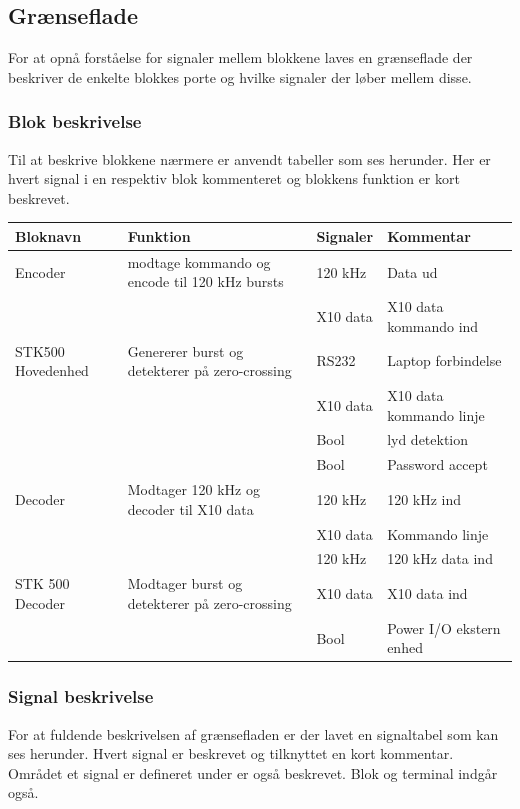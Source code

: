 \clearpage
\newpage

\begin{table}[htbp] %
\subsection{Grænseflade}
For at opnå forståelse for signaler mellem blokkene laves en grænseflade der beskriver de enkelte blokkes porte og hvilke signaler der løber mellem disse.

\subsubsection{Blok beskrivelse}
Til at beskrive blokkene nærmere er anvendt tabeller som ses herunder. Her er hvert signal i en respektiv blok kommenteret og blokkens funktion er kort beskrevet. 

\begin{tabular}{|p{}|p{}|p{}|p{}|}
\hline
\textbf{Bloknavn} & \textbf{Funktion} & \textbf{Signaler} & \textbf{Kommentar} \\ \hline

Encoder & modtage kommando og encode til 120 kHz bursts & 120 kHz & Data ud \\ \cline{3-4}	
& & X10 data & X10 data kommando ind \\ \hline

STK500 Hovedenhed & Genererer burst og detekterer på zero-crossing & RS232 & Laptop forbindelse \\ \cline{3-4}
& & X10 data & X10 data kommando linje \\ \cline{3-4}
& & Bool & lyd detektion \\ \cline{3-4}
& & Bool & Password accept \\ \hline

Decoder & Modtager 120 kHz og decoder til X10 data & 120 kHz & 120 kHz ind \\ \cline{3-4}
& & X10 data & Kommando linje \\ \cline{3-4}
& & 120 kHz & 120 kHz data ind \\ \hline

STK 500 Decoder & Modtager burst og detekterer på zero-crossing & X10 data & X10 data ind \\ \cline{3-4}
&& Bool & Power I/O ekstern enhed \\ \hline 
\end{tabular}

\subsubsection{Signal beskrivelse}
For at fuldende beskrivelsen af grænsefladen er der lavet en signaltabel som kan ses herunder. Hvert signal er beskrevet og tilknyttet en kort kommentar. Området et signal er defineret under er også beskrevet. Blok og terminal indgår også. 


\end{table}

